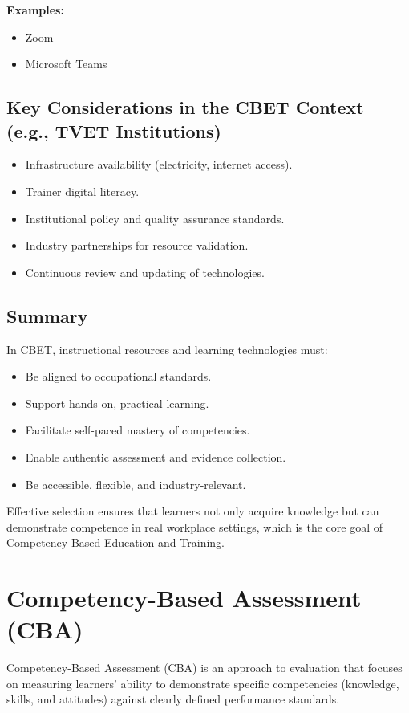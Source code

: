 \documentclass[12pt,a4paper]{article}
\begin{document}
\textbf{Examples:}
\begin{itemize}
    \item Zoom
    \item Microsoft Teams
\end{itemize}

\subsection*{Key Considerations in the CBET Context (e.g., TVET Institutions)}
\begin{itemize}
    \item Infrastructure availability (electricity, internet access).
    \item Trainer digital literacy.
    \item Institutional policy and quality assurance standards.
    \item Industry partnerships for resource validation.
    \item Continuous review and updating of technologies.
\end{itemize}

\subsection*{Summary}
In CBET, instructional resources and learning technologies must:
\begin{itemize}
    \item Be aligned to occupational standards.
    \item Support hands-on, practical learning.
    \item Facilitate self-paced mastery of competencies.
    \item Enable authentic assessment and evidence collection.
    \item Be accessible, flexible, and industry-relevant.
\end{itemize}

Effective selection ensures that learners not only acquire knowledge but can demonstrate competence in real workplace settings, which is the core goal of Competency-Based Education and Training.

\section*{Competency-Based Assessment (CBA)}
Competency-Based Assessment (CBA) is an approach to evaluation that focuses on measuring learners' ability to demonstrate specific competencies (knowledge, skills, and attitudes) against clearly defined performance standards.
\end{document}
